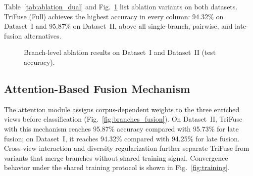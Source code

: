 Table~\ref{tab:ablation_dual} and Fig.~\ref{fig:ablation} list ablation variants on both datasets. TriFuse (Full) achieves the highest accuracy in every column: 94.32\% on Dataset~I and 95.87\% on Dataset~II, above all single-branch, pairwise, and late-fusion alternatives.

\begin{table}[!t]
\caption{Branch-Level Ablation Results}
\label{tab:ablation_dual}
\centering
{}
\end{table}

\begin{figure}[!t]
\centering

\caption{Branch-level ablation results on Dataset~I and Dataset~II (test accuracy).}
\label{fig:ablation}
\end{figure}

\subsection{Attention-Based Fusion Mechanism}

The attention module assigns corpus-dependent weights to the three enriched views before classification (Fig.~\ref{fig:branches_fusion}). On Dataset~II, TriFuse with this mechanism reaches 95.87\% accuracy compared with 95.73\% for late fusion; on Dataset~I, it reaches 94.32\% compared with 94.25\% for late fusion. Cross-view interaction and diversity regularization further separate TriFuse from variants that merge branches without shared training signal. Convergence behavior under the shared training protocol is shown in Fig.~\ref{fig:training}.

